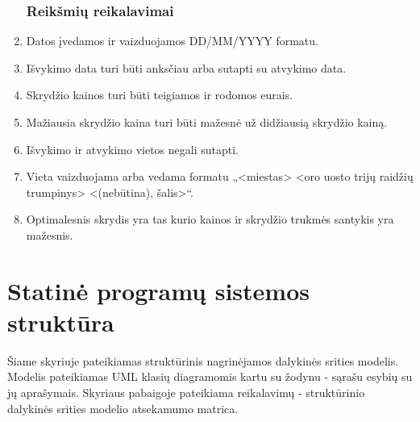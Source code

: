 \documentclass{VUMIFPSkursinis}
\begin{document}
\begin{enumerate}[label=\textbf{NFR\arabic*}.]
					\subsubsection{Reikšmių reikalavimai}
                    	\item Datos įvedamos ir vaizduojamos DD/MM/YYYY formatu.
                    	\item Išvykimo data turi būti anksčiau arba sutapti su atvykimo data.
                    	\item Skrydžio kainos turi būti teigiamos ir rodomos eurais.
                    	\item Mažiausia skrydžio kaina turi būti mažesnė už didžiausią skrydžio kainą.
                    	\item Išvykimo ir atvykimo vietos negali sutapti.
                    	\item Vieta vaizduojama arba vedama formatu „<miestas> <oro uosto trijų raidžių trumpinys> <(nebūtina), šalis>“.
                    	\item \label{optimalus} Optimalesnis skrydis yra tas kurio kainos ir skrydžio trukmės santykis yra mažesnis.
                \end{enumerate}
      
        \section{Statinė programų sistemos struktūra}
            Šiame skyriuje pateikiamas struktūrinis nagrinėjamos dalykinės srities modelis. Modelis pateikiamas UML klasių diagramomis kartu su žodynu - sąrašu esybių su jų aprašymais. Skyriaus pabaigoje pateikiama reikalavimų - struktūrinio dalykinės srities modelio atsekamumo matrica.
\end{document}

